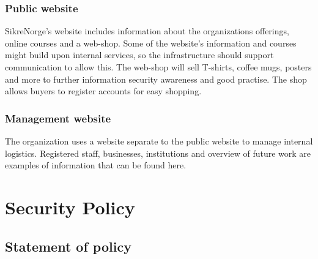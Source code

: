 \subsubsection{Public website}

SikreNorge's website includes information about the organizations offerings, online courses and a web-shop. Some of the website's information and courses might build upon internal services, so the infrastructure should support communication to allow this. The web-shop will sell T-shirts, coffee mugs, posters and more to further information security awareness and good practise. The shop allows buyers to register accounts for easy shopping.

\subsubsection{Management website}

The organization uses a website separate to the public website to manage internal logistics. Registered staff, businesses, institutions and overview of future work are examples of information that can be found here.


\clearpage

\section{Security Policy}


\subsection{Statement of policy}

